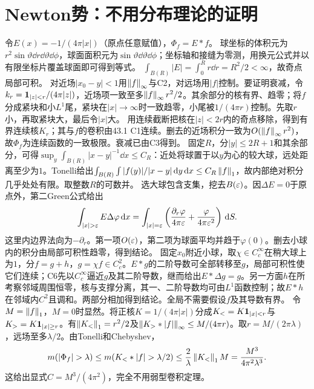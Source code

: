 \documentclass[UTF8,fontset=fandol,11pt]{ctexart}
\begin{document}
\section{Newton势：不用分布理论的证明}
令$E(x)=-1/(4\pi|x|)$（原点任意赋值），$\Phi_f=E*f$。
球坐标的体积元为$r^2\sin\vartheta\dd r\dd\vartheta\dd\phi$，球面面积元为$\sin\vartheta\dd\vartheta\dd\phi$；坐标轴和接缝为零测，用换元公式并以有限坐标片覆盖球面即可得到等式。
$\int_{B(R)}|E|=\int_0^Rr\dd r=R^2/2<\infty$，故奇点局部可积。
对近场$|x_0-y|<1$用$\left\lVert f\right\rVert_\infty$与C2，对远场用$|f|$控制。要证明衰减，令$k_r=\mathbf1_{|z|<r}/(4\pi|z|)$，近场项一致至多$\left\lVert f\right\rVert_\infty r^2/2$。其余部分的核有界、趋零；将$f$分成紧块和小$L^1$尾，紧块在$|x|\to\infty$时一致趋零，小尾被$1/(4\pi r)$控制。先取$r$小，再取紧块大，最后令$|x|$大。
用连续截断把核在$|z|<2r$内的奇点移除，得到有界连续核$K_r$；其与$f$的卷积由43.1 C1连续。删去的近场积分一致为$O(\left\lVert f\right\rVert_\infty r^2)$，故$\Phi_f$为连续函数的一致极限。衰减已由C3得到。
固定$R$，分$|y|\le2R+1$和其余部分，可得$\sup_y\int_{B(R)}|x-y|^{-1}\dd x\le C_R$：近处将球置于以$y$为心的较大球，远处距离至少为$1$。Tonelli给出$\int_{B(R)}\int |f(y)|/|x-y|\,\mathrm d y\,\mathrm d x\le C_R\left\lVert f\right\rVert_1$，故内部绝对积分几乎处处有限。取整数$R$的可数并。
选大球包含支集，挖去$B(\varepsilon)$。因$\Delta E=0$于原点外，第二Green公式给出
\[\int_{|x|>\eps}E\Delta\varphi\dd x=\int_{|x|=\eps}\left(\frac{\partial_r\varphi}{4\pi\eps}+\frac{\varphi}{4\pi\eps^2}\right)\dd S.\]
这里内边界法向为$-\partial_r$。第一项$O(\varepsilon)$，第二项为球面平均并趋于$\varphi(0)$。删去小球内的积分由局部可积性趋零，得到结论。
固定$x_0$附近小球，取$\chi\in C_c^\infty$在稍大球上为$1$，分$f=g+h$，$g=\chi f\in C_c^2$。$E*g$的二阶导数可全部转移至$g$，局部可积性使它们连续；C6先以$C_c^\infty$逼近$g$及其二阶导数，继而给出$E*\Delta g=g$。另一方面$h$在所考察邻域周围恒零，核与支撑分离，其一、二阶导数均可由$L^1$函数控制；故$E*h$在邻域内$C^2$且调和。两部分相加得到结论。全局不需要假设$f$及其导数有界。
令$M=\left\lVert f\right\rVert_1$，$M=0$时显然。将正核$K=1/(4\pi|x|)$分成$K_< =K\mathbf1_{|x|<r}$与$K_> =K\mathbf1_{|x|\ge r}$。有$\left\lVert K_<\right\rVert_1=r^2/2$及$\left\lVert K_>*|f|\right\rVert_\infty\le M/(4\pi r)$。取$r=M/(2\pi\lambda)$，远场至多$\lambda/2$。由Tonelli和Chebyshev，
\[m(|\Phi_f|>\lambda)\le m(K_<*|f|>\lambda/2)\le\frac2\lambda\norm{K_<}_1M=\frac{M^3}{4\pi^2\lambda^3}.\]
这给出显式$C=M^3/(4\pi^2)$，完全不用弱型卷积定理。
\originalpages
\end{document}
